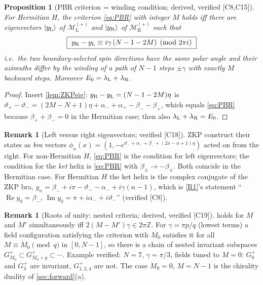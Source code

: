 \documentclass[11pt,a4paper]{article}
\newtheorem{proposition}[theorem]{Proposition}
\theoremstyle{definition}
\newtheorem{remark}[theorem]{Remark}
\newcommand{\ML}[1][s]{\mathcal M_{\mathrm L}^{(#1)}}
\newcommand{\MR}[1][s]{\mathcal M_{\mathrm R}^{(#1)}}
\newcommand{\ver}[1]{\textsf{[#1]}}   %
\newcommand{\re}{\operatorname{Re}}
\newcommand{\im}{\operatorname{Im}}
\begin{document}
\begin{proposition}[PBR criterion = winding condition; derived, verified \ver{C8,C15}]\label{prop:geometric-criterion}
For Hermitian $H$, the criterion \eqref{eq:PBR} with integer $M$ holds iff there are eigenvectors $\ket{y_{\rm L}}$ of $\ML[+]$ and $\ket{y_{\rm R}}$ of $\MR[+]$ such that
\begin{equation}\label{eq:winding}
\boxed{\ y_{\rm R}-y_{\rm L}\equiv i\gamma\,(N-1-2M)\pmod{2\pi i}\ }
\end{equation}
i.e.\ the two boundary-selected spin directions have the same polar angle and their azimuths differ by the winding of a path of $N-1$ steps $\pm\gamma$ with exactly $M$ backward steps. Moreover $E_0=\lambda_{\rm L}+\lambda_{\rm R}$.
\end{proposition}
\begin{proof}
Insert \cref{lem:ZKPeig}: $y_{\rm R}-y_{\rm L}=(N-1-2M)\eta$ is $\vartheta_+-\vartheta_-=(2M-N+1)\eta+\alpha_-+\alpha_+-\beta_--\beta_+$, which equals \eqref{eq:PBR} because $\beta_++\beta_-=0$ in the Hermitian case; then also $\lambda_{\rm L}+\lambda_{\rm R}=E_0$.
\end{proof}

\begin{remark}[Left versus right eigenvectors; verified \ver{C18}]
ZKP construct their states as \emph{bra} vectors $\phi_n(x)=(1,-e^{\vartheta_-+\alpha_-+\beta_-+(2x-n+1)\eta})$ acted on from the right. For non-Hermitian $H$, \eqref{eq:PBR} is the condition for left eigenvectors; the condition for the \emph{ket} helix is \eqref{eq:PBR} with $\beta_\pm\to-\beta_\pm$. Both coincide in the Hermitian case. For Hermitian $H$ the ket helix is the complex conjugate of the ZKP bra, $y_n=\beta_-+i\pi-\vartheta_--\alpha_-+i\gamma(n-1)$, which is \ref{R1}'s statement ``$\re y_0=\beta_-$, $\im y_0=\pi+i\alpha_-+i\vartheta_-$'' (verified \ver{C8}).
\end{remark}

\begin{remark}[Roots of unity: nested criteria; derived, verified \ver{C19}]
 holds for $M$ and $M'$ simultaneously iff $2(M-M')\gamma\in2\pi\mathbb Z$. For $\gamma=\pi p/q$ (lowest terms) a field configuration satisfying the criterion with $M_0$ satisfies it for all $M\equiv M_0\pmod q$ in $[0,N-1]$, so there is a chain of nested invariant subspaces $G^+_{M_0}\subset G^+_{M_0+q}\subset\cdots$. Example verified: $N=7$, $\gamma=\pi/3$, fields tuned to $M=0$: $G^+_0$ and $G^+_3$ are invariant, $G^+_{1,2,4}$ are not. The case $M_0=0$, $M=N-1$ is the chirality duality of \cref{sec:forward}(a).
\end{remark}
\end{document}
